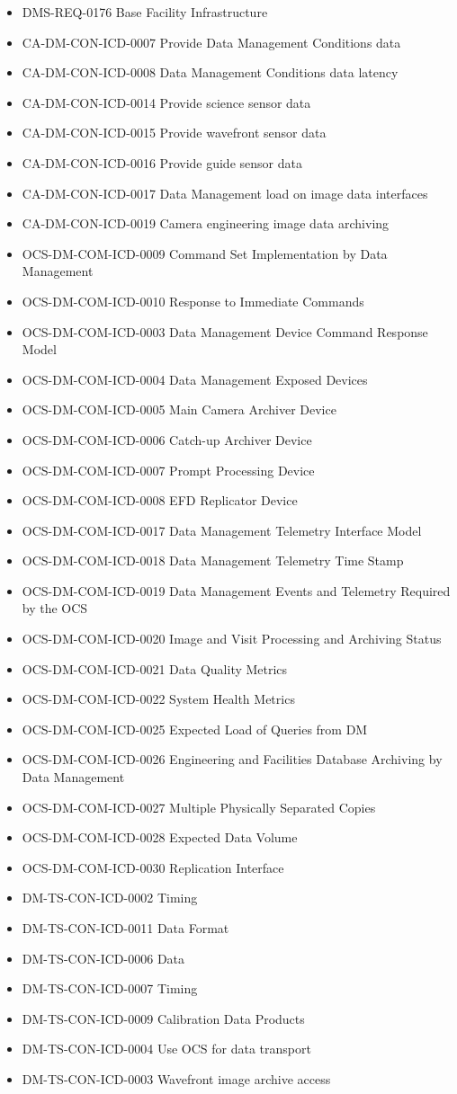 \begin{itemize}
\item DMS-REQ-0176 Base Facility Infrastructure
\item CA-DM-CON-ICD-0007 Provide Data Management Conditions data
\item CA-DM-CON-ICD-0008 Data Management Conditions data latency
\item CA-DM-CON-ICD-0014 Provide science sensor data
\item CA-DM-CON-ICD-0015 Provide wavefront sensor data
\item CA-DM-CON-ICD-0016 Provide guide sensor data
\item CA-DM-CON-ICD-0017 Data Management load on image data interfaces
\item CA-DM-CON-ICD-0019 Camera engineering image data archiving
\item OCS-DM-COM-ICD-0009 Command Set Implementation by Data Management
\item OCS-DM-COM-ICD-0010 Response to Immediate Commands
\item OCS-DM-COM-ICD-0003 Data Management Device Command Response Model
\item OCS-DM-COM-ICD-0004 Data Management Exposed Devices
\item OCS-DM-COM-ICD-0005 Main Camera Archiver Device
\item OCS-DM-COM-ICD-0006 Catch-up Archiver Device
\item OCS-DM-COM-ICD-0007 Prompt Processing Device
\item OCS-DM-COM-ICD-0008 EFD Replicator Device
\item OCS-DM-COM-ICD-0017 Data Management Telemetry Interface Model
\item OCS-DM-COM-ICD-0018 Data Management Telemetry Time Stamp
\item OCS-DM-COM-ICD-0019 Data Management Events and Telemetry Required by the OCS
\item OCS-DM-COM-ICD-0020 Image and Visit Processing and Archiving Status
\item OCS-DM-COM-ICD-0021 Data Quality Metrics
\item OCS-DM-COM-ICD-0022 System Health Metrics
\item OCS-DM-COM-ICD-0025 Expected Load of Queries from DM
\item OCS-DM-COM-ICD-0026 Engineering and Facilities Database Archiving by Data Management
\item OCS-DM-COM-ICD-0027 Multiple Physically Separated Copies
\item OCS-DM-COM-ICD-0028 Expected Data Volume
\item OCS-DM-COM-ICD-0030 Replication Interface
\item DM-TS-CON-ICD-0002 Timing
\item DM-TS-CON-ICD-0011 Data Format
\item DM-TS-CON-ICD-0006 Data
\item DM-TS-CON-ICD-0007 Timing
\item DM-TS-CON-ICD-0009 Calibration Data Products
\item DM-TS-CON-ICD-0004 Use OCS for data transport
\item DM-TS-CON-ICD-0003 Wavefront image archive access
\end{itemize}
